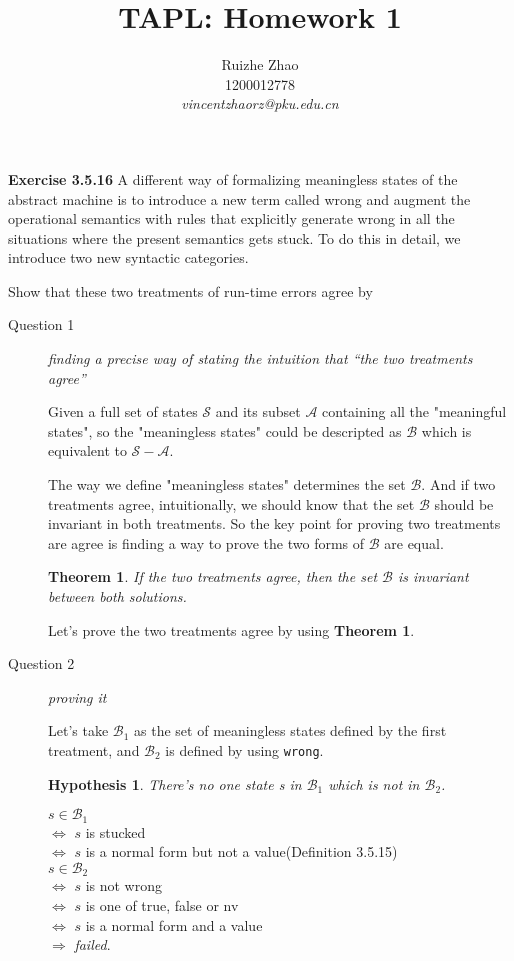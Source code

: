 \documentclass[a4paper, 12pt]{article}
\begin{document}
\title{TAPL: Homework 1}
\author{Ruizhe Zhao\\[10pt]
		1200012778\\
		\textit{vincentzhaorz@pku.edu.cn}}
\date{}
\maketitle

\noindent
\textbf{Exercise 3.5.16} A different way of formalizing meaningless states of the abstract machine is to introduce a new term called wrong and augment the operational semantics with rules that explicitly generate wrong in all the situations where the present semantics gets stuck. To do this in detail, we introduce two new syntactic categories.

Show that these two treatments of run-time errors agree by 
\begin{description}
\item[Question 1] \textit{finding a precise way of stating the intuition that “the two treatments agree”}

Given a full set of states $\mathcal{S}$ and its subset $\mathcal{A}$ containing all the "meaningful states", so the "meaningless states" could be descripted as $\mathcal{B}$ which is equivalent to $\mathcal{S}-\mathcal{A}$.

The way we define "meaningless states" determines the set $\mathcal{B}$. And if two treatments agree, intuitionally, we should know that the set $\mathcal{B}$ should be invariant in both treatments. So the key point for proving two treatments are agree is finding a way to prove the two forms of $\mathcal{B}$ are equal.

\newtheorem{thm}{Theorem}
\begin{thm}
If the two treatments agree, then the set $\mathcal{B}$ is invariant between both solutions.
\end{thm}

Let's prove the two treatments agree by using \textbf{Theorem 1}.

\item[Question 2] \textit{proving it}

Let's take $\mathcal{B}_1$ as the set of meaningless states defined by the first treatment, and $\mathcal{B}_2$ is defined by using \texttt{wrong}.

\newtheorem{hyp}{Hypothesis}

\begin{hyp}
There's no one state s in $\mathcal{B}_1$ which is not in $\mathcal{B}_2$. 
\end{hyp}
$ s \in \mathcal{B}_1$ \\
$\Leftrightarrow$ $s$ is stucked \\
$\Leftrightarrow$ $s$ is a normal form but not a value(Definition 3.5.15)\\
$ s \in \mathcal{B}_2$ \\
$\Leftrightarrow$ $s$ is not wrong \\
$\Leftrightarrow$ $s$ is one of true, false or nv\\
$\Leftrightarrow$ $s$ is a normal form and a value\\
$\Longrightarrow$ \textit{failed}.


\end{description}
\end{document}
